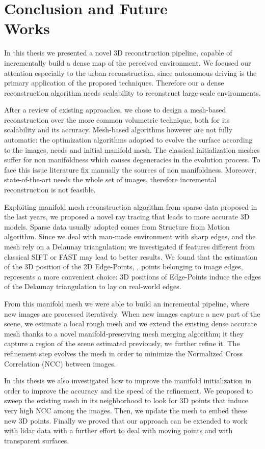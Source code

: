 \chapter[Conclusion and Future Works]{Conclusion and Future \\Works}
\label{ch:future_works}
In this thesis we presented a novel 3D reconstruction pipeline, capable of incrementally build a dense map of the perceived environment.
We focused our attention especially to the urban reconstruction, since autonomous driving is the primary application of the proposed techniques.
Therefore our a dense reconstruction algorithm needs scalability to reconstruct large-scale environments.


After a review of existing approaches, we chose to design a mesh-based reconstruction over the more common volumetric technique, both for its scalability and its accuracy. 
Mesh-based algorithms however are not fully automatic: the optimization algorithms adopted to evolve the surface according to the images, needs and initial manifold mesh. 
The classical initialization meshes suffer for non manifoldness which causes degeneracies in the evolution process. 
To face this issue literature fix manually the sources of non manifoldness. 
Moreover,  state-of-the-art  needs the whole set of images, therefore incremental reconstruction is not feasible.

Exploiting  manifold mesh reconstruction algorithm from sparse data proposed in the last years, we proposed a  novel ray tracing that leads to more accurate 3D models. 
Sparse data usually adopted comes from Structure from Motion algorithm.  
Since we deal with man-made environment with sharp edges, and the mesh rely on a Delaunay triangulation; we investigated if features different from classical SIFT or FAST may lead to better results. 
We found that the estimation of the 3D position of the 2D Edge-Points, \ie, points belonging to image edges, represents a more convenient choice: 3D positions of Edge-Points induce the edges of the Delaunay triangulation to lay on real-world edges.

From this manifold mesh we were able to build an incremental pipeline, where new images are processed iteratively.
When new images  capture a new part of the scene, we estimate a local rough mesh and we extend the existing dense accurate mesh thanks to a novel manifold-preserving mesh merging algorithm; it they capture a region of the scene estimated previously, we further refine it.
The refinement step evolves the mesh in order to minimize the Normalized Cross Correlation (NCC) between images.

In this thesis we also investigated how to improve the manifold initialization in order to improve the accuracy and the speed of the refinement. 
We proposed to sweep the existing mesh in its neighborhood to look for 3D points that induce very high NCC among the images. Then, we  update the mesh to embed these new 3D points.
Finally we proved that our approach can be extended to work with lidar data with a further effort to deal with moving points and with transparent surfaces.



